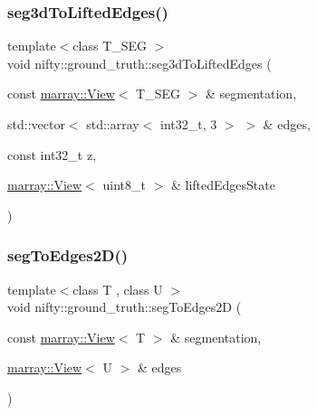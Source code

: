 \mbox{\label{namespacenifty_1_1ground__truth_a6d7ab1dca0ac9229967b736100609112}} 
\subsubsection{\texorpdfstring{seg3d\+To\+Lifted\+Edges()}{seg3dToLiftedEdges()}}
{\footnotesize\ttfamily template$<$class T\+\_\+\+S\+EG $>$ \\
void nifty\+::ground\+\_\+truth\+::seg3d\+To\+Lifted\+Edges (\begin{DoxyParamCaption}\item[{const \hyperlink{classandres_1_1View}{marray\+::\+View}$<$ T\+\_\+\+S\+EG $>$ \&}]{segmentation,  }\item[{std\+::vector$<$ std\+::array$<$ int32\+\_\+t, 3 $>$ $>$ \&}]{edges,  }\item[{const int32\+\_\+t}]{z,  }\item[{\hyperlink{classandres_1_1View}{marray\+::\+View}$<$ uint8\+\_\+t $>$ \&}]{lifted\+Edges\+State }\end{DoxyParamCaption})}

\mbox{\label{namespacenifty_1_1ground__truth_af49d3596b8aaf59bd7dcf3163e99d08f}} 
\subsubsection{\texorpdfstring{seg\+To\+Edges2\+D()}{segToEdges2D()}}
{\footnotesize\ttfamily template$<$class T , class U $>$ \\
void nifty\+::ground\+\_\+truth\+::seg\+To\+Edges2D (\begin{DoxyParamCaption}\item[{const \hyperlink{classandres_1_1View}{marray\+::\+View}$<$ T $>$ \&}]{segmentation,  }\item[{\hyperlink{classandres_1_1View}{marray\+::\+View}$<$ U $>$ \&}]{edges }\end{DoxyParamCaption})}


